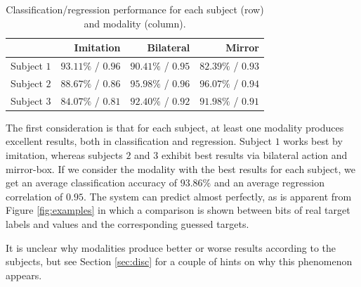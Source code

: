 \begin{table}[!ht] \centering
  \caption{Classification/regression performance for each subject
    (row) and modality (column).}
  \begin{tabular}{|c|r|r|r|}
    \hline
                & Imitation & Bilateral & Mirror \\
    \hline
    Subject $1$ & $93.11\%$ / $0.96$ & $90.41\%$ / $0.95$ & $82.39\%$ / $0.93$ \\
    Subject $2$ & $88.67\%$ / $0.86$ & $95.98\%$ / $0.96$ & $96.07\%$ / $0.94$ \\
    Subject $3$ & $84.07\%$ / $0.81$ & $92.40\%$ / $0.92$ & $91.98\%$ / $0.91$ \\
    \hline
  \end{tabular}
  \label{tab:results}
\end{table}

The first consideration is that for each subject, at least one
modality produces excellent results, both in classification and
regression. Subject $1$ works best by imitation, whereas subjects $2$
and $3$ exhibit best results via bilateral action and mirror-box. If
we consider the modality with the best results for each subject, we
get an average classification accuracy of $93.86\%$ and an average
regression correlation of $0.95$. The system can predict almost
perfectly, as is apparent from Figure \ref{fig:examples} in which a
comparison is shown between bits of real target labels and values and
the corresponding guessed targets.

It is unclear why modalities produce better or worse results according
to the subjects, but see Section \ref{sec:disc} for a couple of hints
on why this phenomenon appears.


